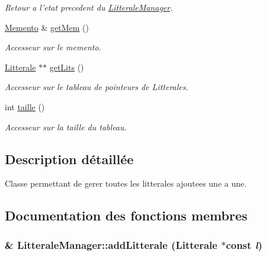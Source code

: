 \begin{CompactItemize}
\begin{CompactList}\small\item\em Retour a l'etat precedent du \hyperlink{class_litterale_manager}{LitteraleManager}. \item\end{CompactList}\item 
\hyperlink{class_memento}{Memento} \& \hyperlink{class_litterale_manager_2dc55ae7c373e339ed59cee0090a781a}{getMem} ()
\begin{CompactList}\small\item\em Accesseur sur le memento. \item\end{CompactList}\item 
\hyperlink{class_litterale}{Litterale} $\ast$$\ast$ \hyperlink{class_litterale_manager_d385d62b811ea974bb98073e5b3ba4b4}{getLits} ()
\begin{CompactList}\small\item\em Accesseur sur le tableau de pointeurs de Litterales. \item\end{CompactList}\item 
int \hyperlink{class_litterale_manager_1395437a2113d2dbcfcdd90891af370e}{taille} ()
\begin{CompactList}\small\item\em Accesseur sur la taille du tableau. \item\end{CompactList}\end{CompactItemize}


\subsection{Description détaillée}
Classe permettant de gerer toutes les litterales ajoutees une a une. 

\subsection{Documentation des fonctions membres}
\hypertarget{class_litterale_manager_bfb29c7c9e5ffdd6904f069def98d2df}{
\subsubsection[{addLitterale}]{ \& LitteraleManager::addLitterale ({\bf Litterale} $\ast$const  {\em l})}}
\label{class_litterale_manager_bfb29c7c9e5ffdd6904f069def98d2df}


